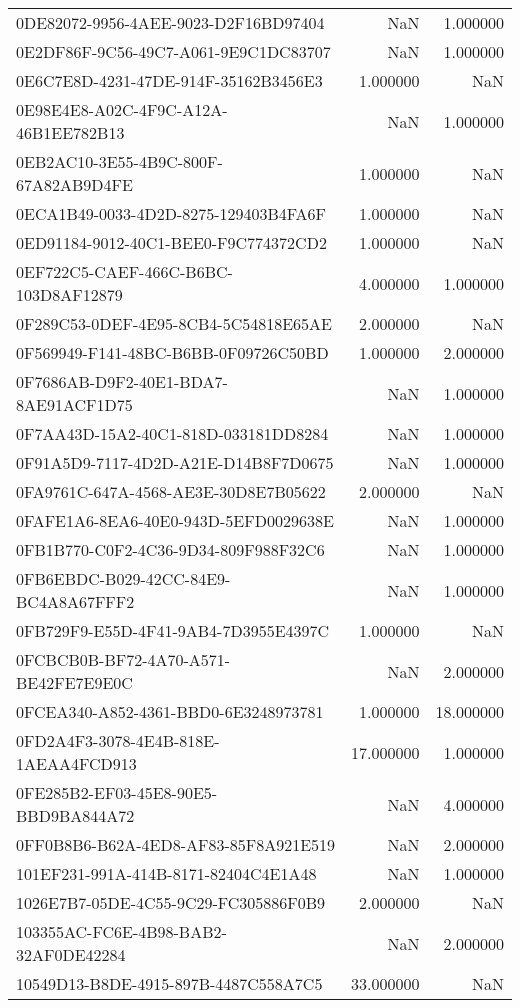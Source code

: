 \begin{tabular}{lrr}
0DE82072-9956-4AEE-9023-D2F16BD97404 & NaN & 1.000000 \\
0E2DF86F-9C56-49C7-A061-9E9C1DC83707 & NaN & 1.000000 \\
0E6C7E8D-4231-47DE-914F-35162B3456E3 & 1.000000 & NaN \\
0E98E4E8-A02C-4F9C-A12A-46B1EE782B13 & NaN & 1.000000 \\
0EB2AC10-3E55-4B9C-800F-67A82AB9D4FE & 1.000000 & NaN \\
0ECA1B49-0033-4D2D-8275-129403B4FA6F & 1.000000 & NaN \\
0ED91184-9012-40C1-BEE0-F9C774372CD2 & 1.000000 & NaN \\
0EF722C5-CAEF-466C-B6BC-103D8AF12879 & 4.000000 & 1.000000 \\
0F289C53-0DEF-4E95-8CB4-5C54818E65AE & 2.000000 & NaN \\
0F569949-F141-48BC-B6BB-0F09726C50BD & 1.000000 & 2.000000 \\
0F7686AB-D9F2-40E1-BDA7-8AE91ACF1D75 & NaN & 1.000000 \\
0F7AA43D-15A2-40C1-818D-033181DD8284 & NaN & 1.000000 \\
0F91A5D9-7117-4D2D-A21E-D14B8F7D0675 & NaN & 1.000000 \\
0FA9761C-647A-4568-AE3E-30D8E7B05622 & 2.000000 & NaN \\
0FAFE1A6-8EA6-40E0-943D-5EFD0029638E & NaN & 1.000000 \\
0FB1B770-C0F2-4C36-9D34-809F988F32C6 & NaN & 1.000000 \\
0FB6EBDC-B029-42CC-84E9-BC4A8A67FFF2 & NaN & 1.000000 \\
0FB729F9-E55D-4F41-9AB4-7D3955E4397C & 1.000000 & NaN \\
0FCBCB0B-BF72-4A70-A571-BE42FE7E9E0C & NaN & 2.000000 \\
0FCEA340-A852-4361-BBD0-6E3248973781 & 1.000000 & 18.000000 \\
0FD2A4F3-3078-4E4B-818E-1AEAA4FCD913 & 17.000000 & 1.000000 \\
0FE285B2-EF03-45E8-90E5-BBD9BA844A72 & NaN & 4.000000 \\
0FF0B8B6-B62A-4ED8-AF83-85F8A921E519 & NaN & 2.000000 \\
101EF231-991A-414B-8171-82404C4E1A48 & NaN & 1.000000 \\
1026E7B7-05DE-4C55-9C29-FC305886F0B9 & 2.000000 & NaN \\
103355AC-FC6E-4B98-BAB2-32AF0DE42284 & NaN & 2.000000 \\
10549D13-B8DE-4915-897B-4487C558A7C5 & 33.000000 & NaN \\

\end{tabular}

